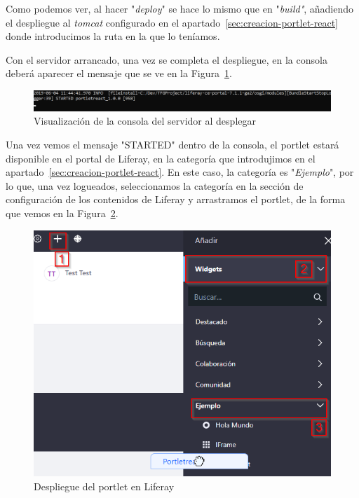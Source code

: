 \documentclass[a4paper, 12pt]{book}
\begin{document}
Como podemos ver, al hacer "\textit{deploy}" se hace lo mismo que en "\textit{build"}, añadiendo el despliegue al \textit{tomcat} configurado en el apartado~\ref{sec:creacion-portlet-react} donde introducimos la ruta en la que lo teníamos.

\vspace{5mm}
Con el servidor arrancado, una vez se completa el despliegue, en la consola deberá aparecer el mensaje que se ve en la Figura~\ref{fig:started}.
\begin{figure}[h]
  \centering
  \includegraphics[width=15cm]{img_usadas/started.png}
  \caption{Visualización de la consola del servidor al desplegar}
  \label{fig:started}
\end{figure}

\vspace{5mm}
Una vez vemos el mensaje "STARTED" dentro de la consola, el portlet estará disponible en el portal de Liferay, en la categoría que introdujimos en el apartado~\ref{sec:creacion-portlet-react}. En este caso, la categoría es "\textit{Ejemplo}", por lo que, una vez logueados, seleccionamos la categoría en la sección de configuración de los contenidos de Liferay y arrastramos el portlet, de la forma que vemos en la Figura~\ref{fig:liferay_ex}.
\begin{figure}[h]
  \centering
  \includegraphics{img_usadas/liferay_ex.png}
  \caption{Despliegue del portlet en Liferay}
  \label{fig:liferay_ex}
\end{figure}
\end{document}
